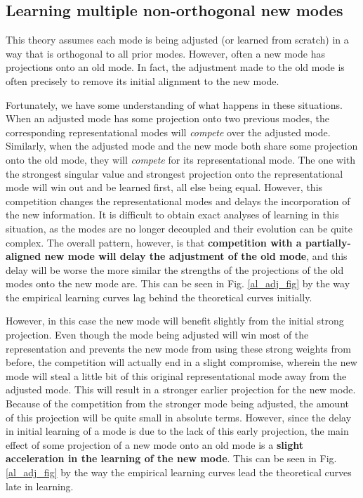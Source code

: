 \documentclass{article}
\begin{document}
\subsection{Learning multiple non-orthogonal new modes}
This theory assumes each mode is being adjusted (or learned from scratch) in a way that is orthogonal to all prior modes. However, often a new mode has projections onto an old mode. In fact, the adjustment made to the old mode is often precisely to remove its initial alignment to the new mode. \par 
Fortunately, we have some understanding of what happens in these situations. When an adjusted mode has some projection onto two previous modes, the corresponding representational modes will \emph{compete} over the adjusted mode. Similarly, when the adjusted mode and the new mode both share some projection onto the old mode, they will \emph{compete} for its representational mode. The one with the strongest singular value and strongest projection onto the representational mode will win out and be learned first, all else being equal. However, this competition changes the representational modes and delays the incorporation of the new information. It is difficult to obtain exact analyses of learning in this situation, as the modes are no longer decoupled and their evolution can be quite complex. The overall pattern, however, is that \textbf{competition with a partially-aligned new mode will delay the adjustment of the old mode}, and this delay will be worse the more similar the strengths of the projections of the old modes onto the new mode are. This can be seen in Fig. \ref{al_adj_fig} by the way the empirical learning curves lag behind the theoretical curves initially. \par
However, in this case the new mode will benefit slightly from the initial strong projection. Even though the mode being adjusted will win most of the representation and prevents the new mode from using these strong weights from before, the competition will actually end in a slight compromise, wherein the new mode will steal a little bit of this original representational mode away from the adjusted mode. This will result in a stronger earlier projection for the new mode. Because of the competition from the stronger mode being adjusted, the amount of this projection will be quite small in absolute terms. However, since the delay in initial learning of a mode is due to the lack of this early projection, the main effect of some projection of a new mode onto an old mode is a \textbf{slight acceleration in the learning of the new mode}. This can be seen in Fig. \ref{al_adj_fig} by the way the empirical learning curves lead the theoretical curves late in learning. \par
\end{document}
